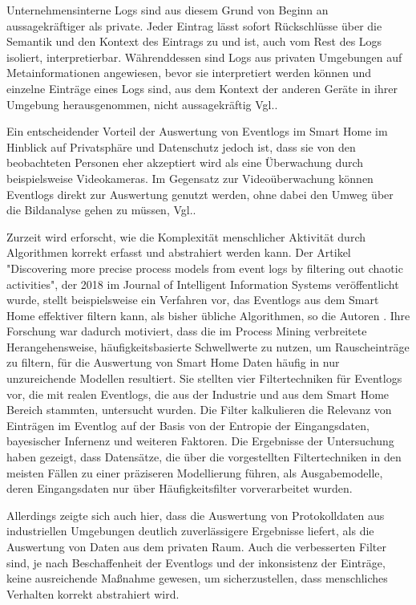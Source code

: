 Unternehmensinterne Logs sind aus diesem Grund von Beginn an aussagekräftiger als private. Jeder Eintrag lässt sofort Rückschlüsse über die Semantik und den Kontext des Eintrags zu und ist, auch vom Rest des Logs isoliert, interpretierbar. Währenddessen sind Logs aus privaten Umgebungen auf Metainformationen angewiesen, bevor sie interpretiert werden können und einzelne Einträge eines Logs sind, aus dem Kontext der anderen Geräte in ihrer Umgebung herausgenommen, nicht aussagekräftig Vgl.\cite{Jaroucheh2011}.

Ein entscheidender Vorteil der Auswertung von Eventlogs im Smart Home im Hinblick auf Privatsphäre und Datenschutz jedoch ist, dass sie von den beobachteten Personen eher akzeptiert wird als eine Überwachung durch beispielsweise Videokameras. Im Gegensatz zur Videoüberwachung können Eventlogs direkt zur Auswertung genutzt werden, ohne dabei den Umweg über die Bildanalyse gehen zu müssen, Vgl.\cite{TaxSidorova}.

Zurzeit wird erforscht, wie die Komplexität menschlicher Aktivität durch Algorithmen korrekt erfasst und abstrahiert werden kann. Der Artikel "Discovering more precise process models from event logs by filtering out chaotic activities", der 2018 im Journal of Intelligent Information Systems veröffentlicht wurde, stellt beispielsweise ein Verfahren vor, das Eventlogs aus dem Smart Home effektiver filtern kann, als bisher übliche Algorithmen, so die Autoren \cite{Tax2019}. Ihre Forschung war dadurch motiviert, dass die im Process Mining verbreitete Herangehensweise, häufigkeitsbasierte Schwellwerte zu nutzen, um Rauscheinträge zu filtern, für die Auswertung von Smart Home Daten häufig in nur unzureichende Modellen resultiert. 
Sie stellten vier Filtertechniken für Eventlogs vor, die mit realen Eventlogs, die aus der Industrie und aus dem Smart Home Bereich stammten, untersucht wurden. Die Filter kalkulieren die Relevanz von Einträgen im Eventlog auf der Basis von der Entropie der Eingangsdaten, bayesischer Infernenz und weiteren Faktoren. Die Ergebnisse der Untersuchung haben gezeigt, dass Datensätze, die über die vorgestellten Filtertechniken in den meisten Fällen zu einer präziseren Modellierung führen, als Ausgabemodelle, deren Eingangsdaten nur über Häufigkeitsfilter vorverarbeitet wurden. 

Allerdings zeigte sich auch hier, dass die Auswertung von Protokolldaten aus industriellen Umgebungen deutlich zuverlässigere Ergebnisse liefert, als die Auswertung von Daten aus dem privaten Raum. Auch die verbesserten Filter sind, je nach Beschaffenheit der Eventlogs und der inkonsistenz der Einträge, keine ausreichende Maßnahme gewesen, um sicherzustellen, dass  menschliches Verhalten korrekt abstrahiert wird.

